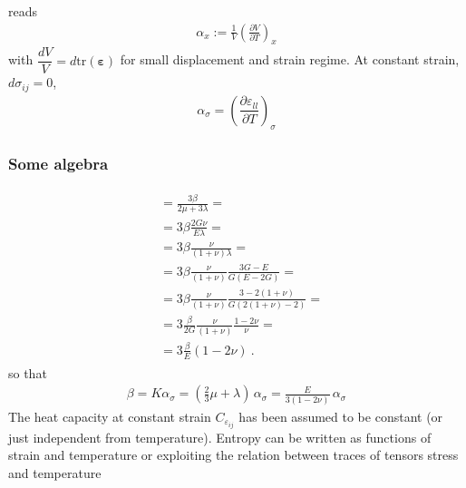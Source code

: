\documentclass[letterpaper,10pt,english]{jupyterBook}
\begin{document}
\sphinxAtStartPar
{} reads
\begin{equation*}
\begin{split}\alpha_x := \frac{1}{V} \left( \frac{\partial V}{\partial T}\right)_x\end{split}
\end{equation*}
\sphinxAtStartPar
with \(\dfrac{dV}{V} = d \text{tr}(\symbf{\varepsilon})\) for small displacement and strain regime. At constant strain, \(d \sigma_{ij} = 0\),
\begin{equation*}
\begin{split}
  \alpha_{\sigma} = \left( \dfrac{\partial \varepsilon_{ll}}{\partial T} \right)_{\sigma}
\end{split}
\end{equation*}\subsubsection*{Some algebra}
\begin{equation*}
\begin{split}\begin{aligned}
  & = \frac{3 \beta}{2 \mu + 3 \lambda} = \\
  & = 3 \beta \frac{2 G \nu }{E \lambda} = \\
  & = 3 \beta \frac{\nu }{(1+ \nu) \lambda} = \\
  & = 3 \beta \frac{\nu }{(1+ \nu)} \frac{3G-E}{G(E-2G)} = \\
  & = 3 \beta \frac{\nu }{(1+ \nu)} \frac{3-2(1+\nu)}{G\left(2(1+\nu)  -2 \right)} = \\
  & = 3 \frac{\beta}{2G} \frac{\nu }{(1+ \nu)} \frac{1-2\nu}{\nu} = \\
  & = 3 \frac{\beta}{E} (1 - 2 \nu)  \ .
\end{aligned}\end{split}
\end{equation*}
\sphinxAtStartPar
so that
\begin{equation*}
\begin{split}\beta = K \alpha_{\sigma} = \left( \frac{2}{3} \mu +  \lambda \right) \, \alpha_{\sigma} = \frac{E}{3(1-2\nu)} \, \alpha_{\sigma} \end{split}
\end{equation*}
\sphinxAtStartPar
{} The heat capacity at constant strain \(C_{\varepsilon_{ij}}\) has been assumed to be constant (or just independent from temperature). Entropy can be written as functions of strain and temperature or \sphinxhyphen{} exploiting the relation between traces of tensors \sphinxhyphen{} stress and temperature
\end{document}
